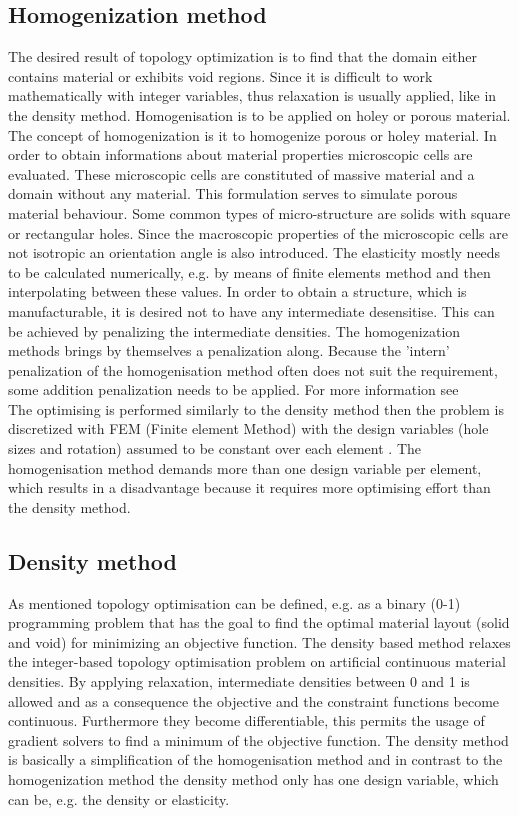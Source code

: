 
\subsection{Homogenization method}
The desired result of topology optimization is
to find  that the domain either contains material or exhibits void regions. Since it is difficult to work mathematically with integer variables, thus relaxation is usually applied, 
like in the density method. Homogenisation is
 to be applied on holey or 	porous material. The concept 
 of homogenization is it to homogenize porous or 
 holey material. In order to obtain informations about
 material properties microscopic cells are evaluated. 
 These microscopic cells are constituted of massive 
 material and a domain without any material. 
 This formulation serves to simulate porous material behaviour.
 Some common types of micro-structure are solids with square or rectangular holes. 
 Since the macroscopic properties of the microscopic cells are not isotropic an orientation angle is also introduced. 
 The elasticity mostly needs to be calculated numerically, e.g. by means of finite elements method and then interpolating between these values. 
 In order to obtain a structure, which is manufacturable, it is desired not to have any intermediate desensitise. This can be achieved by penalizing the intermediate densities. The homogenization methods brings by themselves a penalization along. Because the 'intern' penalization of the homogenisation method often does not suit the requirement, some addition penalization needs to be applied. For more information see \cite{Bendse.1988}\\

The optimising is performed similarly to the density method then
the problem is discretized with FEM (Finite element Method) with the design variables (hole sizes and rotation) assumed to be constant over each element
\cite{Olason.2010}. The homogenisation method demands more than one design variable per element, which results in a disadvantage because it requires more optimising effort than the density method.
 
\subsection{Density method}
As mentioned topology optimisation can be defined, e.g.
 as a binary (0-1) programming problem that has the goal to find the optimal material layout (solid and void) for minimizing an objective function. The density based method relaxes the integer-based topology optimisation problem on artificial continuous material densities. By applying relaxation, intermediate densities between 0 and 1 is allowed and as a consequence the objective and the constraint functions become continuous. Furthermore they become differentiable, this permits the usage of gradient solvers to find a minimum of the objective function. The density method is basically a simplification of the homogenisation method and in contrast to the homogenization method the density method only has one design variable, which can be, e.g. the density or elasticity. 
 
